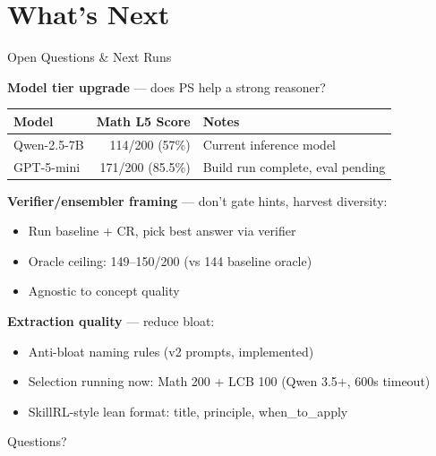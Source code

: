 \documentclass[10pt]{beamer}
\begin{document}
\section{What's Next}

\begin{frame}{Open Questions \& Next Runs}

  \textbf{Model tier upgrade} --- does PS help a strong reasoner?
  \begin{table}
    \scriptsize
    \begin{tabular}{@{} l r l @{}}
      \toprule
      Model & Math L5 Score & Notes \\
      \midrule
      Qwen-2.5-7B & 114/200 (57\%) & Current inference model \\
      GPT-5-mini & 171/200 (85.5\%) & Build run complete, eval pending \\
      \bottomrule
    \end{tabular}
  \end{table}

  \vspace{0.5em}
  \textbf{Verifier/ensembler framing} --- don't gate hints, harvest diversity:
  \begin{itemize}\setlength\itemsep{2pt}
    \item Run baseline + CR, pick best answer via verifier
    \item Oracle ceiling: 149--150/200 (vs 144 baseline oracle)
    \item Agnostic to concept quality
  \end{itemize}

  \vspace{0.5em}
  \textbf{Extraction quality} --- reduce bloat:
  \begin{itemize}\setlength\itemsep{2pt}
    \item Anti-bloat naming rules (v2 prompts, implemented)
    \item Selection running now: Math 200 + LCB 100 (Qwen 3.5+, 600s timeout)
    \item SkillRL-style lean format: title, principle, when\_to\_apply
  \end{itemize}
\end{frame}


\begin{frame}[standout]
  Questions?
\end{frame}
\end{document}
